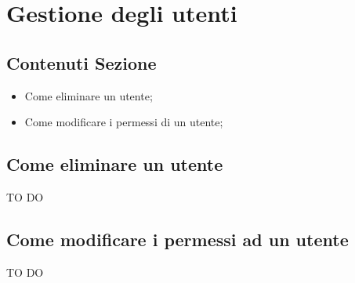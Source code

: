 %

\section{Gestione degli utenti} %
\label{sec:gestione_utenti}
	\subsection{Contenuti Sezione} %
	\label{sub:contenuti_sezione}
	\begin{itemize}
		\item Come eliminare un utente;
		\item Come modificare i permessi di un utente;
	\end{itemize}

	\subsection{Come eliminare un utente}
	\label{sub:elimina_utente}
	TO DO
	
	
	
	\subsection{Come modificare i permessi ad un utente}
	\label{sub:modifica_permessi_utente}
	TO DO

